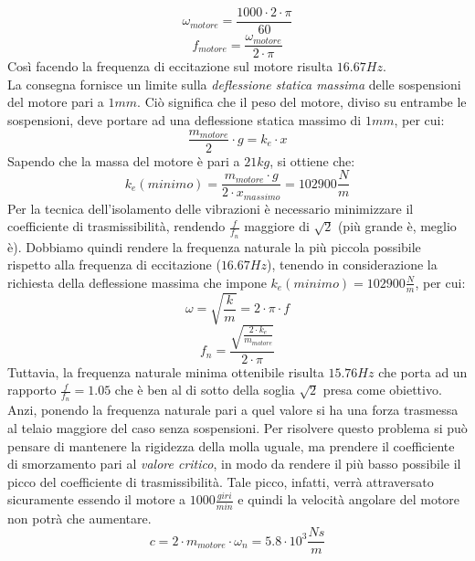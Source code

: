 \documentclass[12pt, a4paper]{article}
\begin{document}
	\[\omega_{motore}=\frac{1000 \cdot 2 \cdot \pi}{60}\]
	\[f_{motore}=\frac{\omega_{motore}}{2 \cdot \pi}\]   
	Così facendo la frequenza di eccitazione sul motore risulta $16.67Hz$.\\
	La consegna fornisce un limite sulla \textit{deflessione statica massima} delle sospensioni del motore pari a $1mm$. Ciò significa che il peso del motore, diviso su entrambe le sospensioni, deve portare ad una deflessione statica massimo di $1mm$, per cui:
	\[\frac{m_{motore}}{2} \cdot g = k_{e} \cdot x \] 
	Sapendo che la massa del motore è pari a $21kg$, si ottiene che:
	\[k_{e}(minimo)=\frac{m_{motore} \cdot g}{2 \cdot x_{massimo}}= 102900\frac{N}{m}\]  
	Per la tecnica dell'isolamento delle vibrazioni è necessario minimizzare il coefficiente di trasmissibilità, rendendo $\frac{f}{f_{n}}$ maggiore di $\sqrt{2}$ (più grande è, meglio è). Dobbiamo quindi rendere la frequenza naturale la più piccola possibile rispetto alla frequenza di eccitazione ($16.67Hz$), tenendo in considerazione la richiesta della deflessione massima che impone $k_{e}(minimo) = 102900\frac{N}{m}$, per cui:
	\[\omega = \sqrt{\frac{k}{m}} = 2 \cdot \pi \cdot f \]
	\[f_{n}= \frac{\sqrt{\frac{2 \cdot k_{e}}{m_{motore}}}}{2 \cdot \pi} \]
	Tuttavia, la frequenza naturale minima ottenibile risulta $15.76Hz$ che porta ad un rapporto $\frac{f}{f_{n}}=1.05$ che è ben al di sotto della soglia $\sqrt{2}$ presa come obiettivo. Anzi, ponendo la frequenza naturale pari a quel valore si ha una forza trasmessa al telaio maggiore del caso senza sospensioni. Per risolvere questo problema si può pensare di mantenere la rigidezza della molla uguale, ma prendere il coefficiente di smorzamento pari al \textit{valore critico}, in modo da rendere il più basso possibile il picco del coefficiente di trasmissibilità. Tale picco, infatti, verrà attraversato sicuramente essendo il motore a $1000\frac{giri}{min}$ e quindi la velocità angolare del motore non potrà che aumentare.
	\[c = 2 \cdot m_{motore} \cdot \omega_{n} = 5.8 \cdot 10^{3} \frac{Ns}{m} \]  
	   
	
\end{document}
